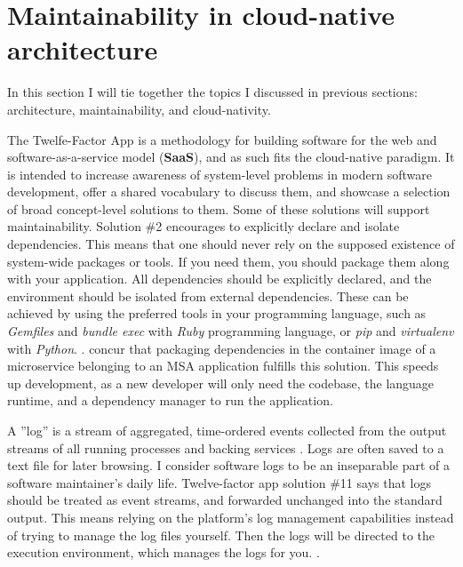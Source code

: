 \documentclass[utf8,english]{gradu3}
\begin{document}
\section{Maintainability in cloud-native architecture}

In this section I will tie together the topics I discussed in previous sections:
architecture, maintainability, and cloud-nativity.

The Twelfe-Factor App \parencite{12factor2017} is a methodology for building
software for the web and software-as-a-service model (\textbf{SaaS}), and as
such fits the cloud-native paradigm. It is intended to increase awareness of
system-level problems in modern software development, offer a shared vocabulary
to discuss them, and showcase a selection of broad concept-level solutions to
them. Some of these solutions will support maintainability. Solution \#2
encourages to explicitly declare and isolate dependencies. This means that one
should never rely on the supposed existence of system-wide packages or tools. If
you need them, you should package them along with your application. All
dependencies should be explicitly declared, and the environment should be
isolated from external dependencies. These can be achieved by using the
preferred tools in your programming language, such as \textit{Gemfiles} and
\textit{bundle exec} with \textit{Ruby} programming language, or \textit{pip}
and \textit{virtualenv} with \textit{Python}. \parencite{12factor2017}.
\textcite{Microsoft2022-CNA} concur that packaging dependencies in the container
image of a microservice belonging to an MSA application fulfills this solution.
This speeds up development, as a new developer will only need the codebase,
the language runtime, and a dependency manager to run the application.

A ''log'' is a stream of aggregated, time-ordered events collected from the
output streams of all running processes and backing services
\parencite{12factor2017}. Logs are often saved to a text file for later browsing. I
consider software logs to be an inseparable part of a software maintainer's
daily life. Twelve-factor app solution \#11 says that logs should be treated as event
streams, and forwarded unchanged into the standard output. This means relying on
the platform's log management capabilities instead of trying to manage the log
files yourself. Then the logs will be directed to the execution environment,
which manages the logs for you. \parencite{12factor2017}.
\end{document}

